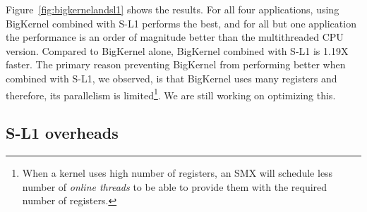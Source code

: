 Figure~\ref{fig:bigkernelandsl1} shows the results.
For all four applications, using BigKernel combined with S-L1 performs the best,
and for all but one application the performance is an order of magnitude better than the multithreaded CPU version.
Compared to BigKernel alone, BigKernel combined with S-L1 is 1.19X faster.
The primary reason preventing BigKernel from performing better when combined with S-L1, we observed,
is that BigKernel uses many registers and therefore, its parallelism is
limited\footnote{When a kernel uses high number of registers, an SMX will schedule less number of {\it
online threads} to be able to provide them with the required number of registers.}. 
We are still working on optimizing this.






\subsection{S-L1 overheads}
\label{sec:sl1overheadsresults}

